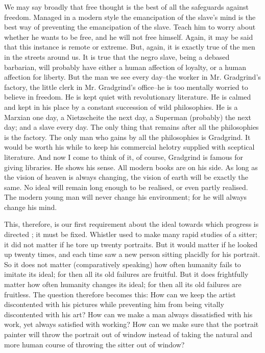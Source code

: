 \documentclass{book}
\begin{document}
We may say broadly that free thought is the best of all the safeguards against freedom. Managed in a modern style the emancipation of the slave’s mind is the best way of preventing the emancipation of the slave. Teach him to worry about whether he wants to be free, and he will not free himself. Again, it may be said that this instance is remote or extreme. But, again, it is exactly true of the men in the streets around us. It is true that the negro slave, being a debased barbarian, will probably have either a human affection of loyalty, or a human affection for liberty. But the man we see every day–the worker in Mr. Gradgrind’s factory, the little clerk in Mr. Gradgrind’s office–he is too mentally worried to believe in freedom. He is kept quiet with revolutionary literature. He is calmed and kept in his place by a constant succession of wild philosophies. He is a Marxian one day, a Nietzscheite the next day, a Superman (probably) the next day; and a slave every day. The only thing that remains after all the philosophies is the factory. The only man who gains by all the philosophies is Gradgrind. It would be worth his while to keep his commercial helotry supplied with sceptical literature. And now I come to think of it, of course, Gradgrind is famous for giving libraries. He shows his sense. All modern books are on his side. As long as the vision of heaven is always changing, the vision of earth will be exactly the same. No ideal will remain long enough to be realised, or even partly realised. The modern young man will never change his environment; for he will always change his mind.

This, therefore, is our first requirement about the ideal towards which progress is directed ; it must be fixed. Whistler used to make many rapid studies of a sitter; it did not matter if he tore up twenty portraits. But it would matter if he looked up twenty times, and each time saw a new person sitting placidly for his portrait. So it does not matter (comparatively speaking) how often humanity fails to imitate its ideal; for then all its old failures are fruitful. But it does frightfully matter how often humanity changes its ideal; for then all its old failures are fruitless. The question therefore becomes this: How can we keep the artist discontented with his pictures while preventing him from being vitally discontented with his art? How can we make a man always dissatisfied with his work, yet always satisfied with working? How can we make sure that the portrait painter will throw the portrait out of window instead of taking the natural and more human course of throwing the sitter out of window?
\end{document}
